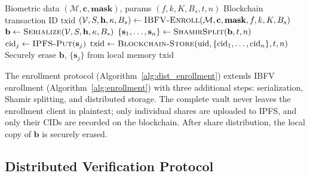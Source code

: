 \documentclass[3p,twocolumn]{elsarticle}
\newcommand{\IBFV}{\textsf{IBFV}}
\newcommand{\DIBFV}{\textsf{D-IBFV}}
\begin{document}
\begin{algorithm}[t]
\caption{\DIBFV{} Distributed Enrollment}
\label{alg:dist_enrollment}
\begin{algorithmic}[1]
\REQUIRE Biometric data $(\mathcal{M}, \mathbf{c}, \mathbf{mask})$, params $(f, k, K, B_s, t, n)$
\ENSURE Blockchain transaction ID $\mathrm{txid}$
\STATE $(\mathcal{V}, S, \mathbf{h}, \kappa, B_s) \leftarrow \textsc{IBFV-Enroll}(\mathcal{M}, \mathbf{c}, \mathbf{mask}, f, k, K, B_s)$
\STATE $\mathbf{b} \leftarrow \textsc{Serialize}(\mathcal{V}, S, \mathbf{h}, \kappa, B_s)$
\STATE $\{\mathbf{s}_1, \ldots, \mathbf{s}_n\} \leftarrow \textsc{ShamirSplit}(\mathbf{b}, t, n)$ 
    \STATE $\mathrm{cid}_j \leftarrow \textsc{IPFS-Put}(\mathbf{s}_j)$ 
\ENDFOR
\STATE $\mathrm{txid} \leftarrow \textsc{Blockchain-Store}(\mathrm{uid}, \{\mathrm{cid}_1, \ldots, \mathrm{cid}_n\}, t, n)$
\STATE Securely erase $\mathbf{b}$, $\{\mathbf{s}_j\}$ from local memory
\RETURN $\mathrm{txid}$
\end{algorithmic}
\end{algorithm}

The enrollment protocol (Algorithm~\ref{alg:dist_enrollment}) extends \IBFV{} enrollment (Algorithm~\ref{alg:enrollment}) with three additional steps: serialization, Shamir splitting, and distributed storage. The complete vault never leaves the enrollment client in plaintext; only individual shares are uploaded to IPFS, and only their CIDs are recorded on the blockchain. After share distribution, the local copy of $\mathbf{b}$ is securely erased.

\subsection{Distributed Verification Protocol}
\label{sec:dist_verification}
\end{document}
